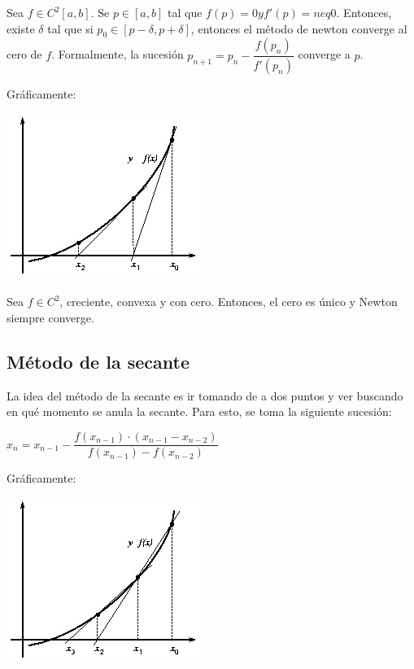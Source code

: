 \documentclass[]{article}
\begin{document}
\begin{prop}
	Sea $f\in C^2[a,b]$. Se $p\in[a,b]$ tal que $f(p)=0 y f'(p)=neq0$. Entonces, existe $\delta$ tal que si $p_0\in[p-\delta,p+\delta]$, entonces el método de newton converge al cero de $f$. Formalmente, la sucesión $p_{n+1} = p_n - \dfrac{f(p_n)}{f'(p_n)}$ converge a $p$.
\end{prop}

Gráficamente:
\begin{center}
	\includegraphics[scale=1]{newton.jpg}
\end{center}

\begin{prop}
	Sea $f\in C^2$, creciente, convexa y con cero. Entonces, el cero es único y Newton siempre converge.
\end{prop}

\subsection{Método de la secante}
La idea del método de la secante es ir tomando de a dos puntos y ver buscando en qué momento se anula la secante. Para esto, se toma la siguiente sucesión:
\begin{center}
	$x_n = x_{n-1} - \dfrac{f(x_{n-1})\cdot(x_{n-1}-x_{n-2})}{f(x_{n-1})-f(x_{n-2})}$
\end{center}

Gráficamente:
\begin{center}
	\includegraphics[scale=1]{secante.jpg}
\end{center}
\end{document}
